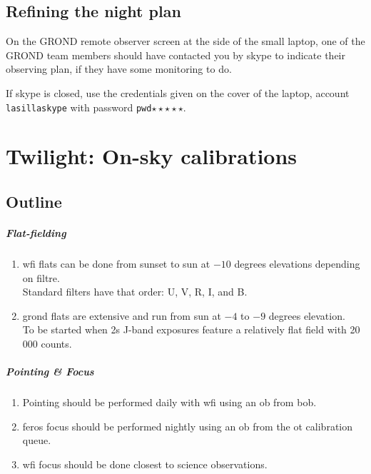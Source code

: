 \documentclass[11pt,fleqn]{book} %
\begin{document}
\section{Refining the night plan}

On the GROND remote observer screen at the side of the small laptop, one of the
GROND team members should have contacted you by skype to indicate their observing plan, if they have some monitoring to do.

If skype is closed, use the credentials given on the cover of the laptop, account \texttt{lasillaskype} with password \texttt{pwd}$\star\star\star\star\star$.



\chapter{Twilight: On-sky calibrations}
\label{nightcal}


\section{Outline}

\paragraph{Flat-fielding}
\begin{enumerate}
  \item \gls{wfi} flats can be done from sunset to sun at $-10$ degrees elevations depending on filtre.\\
        Standard filters have that order: U, V, R, I, and B.
  \item \gls{grond} flats are extensive and run from sun at $-4$ to $-9$ degrees elevation.\\
        To be started when 2s J-band exposures feature a
        relatively flat field with 20\,000 counts.
\end{enumerate}

\paragraph{Pointing \& Focus}
\begin{enumerate}
  \item Pointing should be performed daily with \gls{wfi}
        using an \gls{ob} from \gls{bob}.
  \item \gls{feros} focus should be performed nightly using an \gls{ob} from
        the \gls{ot} calibration queue.
  \item \gls{wfi} focus should be done closest to science observations.
\end{enumerate} 
\end{document}
